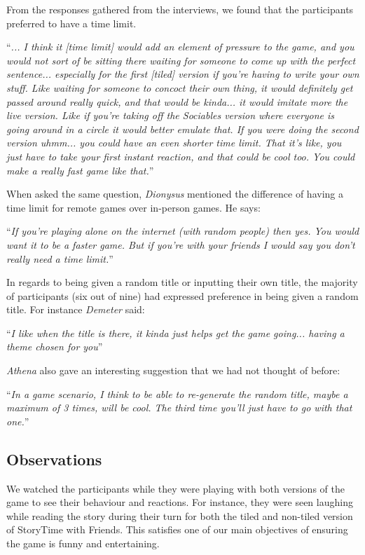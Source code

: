 \documentclass{sigchi}
\begin{document}
From the responses gathered from the interviews, we found that the participants preferred to have a time limit. 

\thinspace \thinspace
``\textit{... I think it [time limit] would add an element of pressure to the game, and you would not sort of be sitting there waiting for someone to come up with the perfect sentence... especially for the first [tiled] version if you're having to write your own stuff. Like waiting for someone to concoct their own thing, it would definitely get passed around really quick, and that would be kinda... it would imitate more the live version. Like if you're taking off the Sociables version where everyone is going around in a circle it would better emulate that. If you were doing the second version uhmm... you could have an even shorter time limit. That it's like, you just have to take your first instant reaction, and that could be cool too. You could make a really fast game like that.}'' %

When asked the same question, \textit{Dionysus} mentioned the difference of having a time limit for remote games over in-person games. He says:

\thinspace \thinspace ``\textit{If you're playing alone on the internet (with random people) then yes. You would want it to be a faster game. But if you're with your friends I would say you don't really need a time limit.}'' \thinspace \thinspace

In regards to being given a random title or inputting their own title, the majority of participants (six out of nine) had expressed preference in being given a random title. For instance \textit{Demeter} said:

``\textit{I like when the title is there, it kinda just helps get the game going... having a theme chosen for you}''\thinspace \thinspace 

\textit{Athena} also gave an interesting suggestion that we had not thought of before: 

``\textit{In a game scenario, I think to be able to re-generate the random title, maybe a maximum of 3 times, will be cool. The third time you'll just have to go with that one.}'' \thinspace \thinspace

\subsection{Observations}
We watched the participants while they were playing with both versions of the game to see their behaviour and reactions. For instance, they were seen laughing while reading the story during their turn for both the tiled and non-tiled version of StoryTime with Friends. This satisfies one of our main objectives of ensuring the game is funny and entertaining. 
\end{document}
